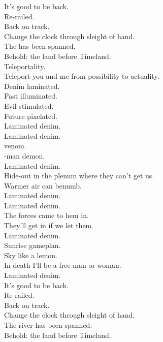 
\label{album:laminated-denim}




It's good to be back. \\
Re-railed. \\
Back on track. \\
Change the clock through sleight of hand. \\
The  has been spanned. \\
Behold: the land before Timeland. \\

Teleportality. \\
Teleport you and me from possibility to actuality. \\
Denim laminated. \\
Past illuminated. \\
Evil stimulated. \\
Future pixelated. \\

Laminated denim. \\

Laminated denim. \\
 venom. \\
-man demon. \\
Laminated denim. \\
Hide-out in the plenum where they can't get us. \\
Warmer air can benumb. \\
Laminated denim. \\

Laminated denim. \\
The forces came to hem in. \\
They'll get in if we let them. \\
Laminated denim. \\
Sunrise gameplan. \\
Sky like a lemon. \\
In death I'll be a free man or woman. \\
Laminated denim. \\

It's good to be back. \\
Re-railed. \\
Back on track. \\
Change the clock through sleight of hand. \\
The river has been spanned. \\
Behold: the land before Timeland. \\

